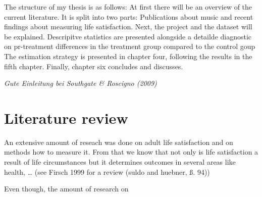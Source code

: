 \documentclass[a4, 12pt]{article}
\begin{document}
The structure of my thesis is as follows: At first there will be an overview of the current literature. It is split into two parts: Publications about music and recent findings about measuring life satisfaction. Next, the project and the dataset will be explained. Descripitve statistics are presented alongside a detailde diagnostic on pr-treatment differences in the treatment group compared to the control goup The estimation strategy is presented in chapter four, following the results in the fifth chapter. Finally, chapter six concludes and discusses.

\emph{Gute Einleitung bei Southgate \& Roscigno (2009)}
\clearpage

\hypertarget{literature-review}{%
\section{Literature review}\label{literature-review}}

\label{sec:literature_review}

An extensive amount of reseach was done on adult life satisfaction and on methods how to measure it. From that we know that not only is life satisfaction a result of life circumstances but it determines outcomes in several areas like health, \ldots{} (see Firsch 1999 for a review (suldo and huebner, ß. 94))

Even though, the amount of research on
\end{document}
